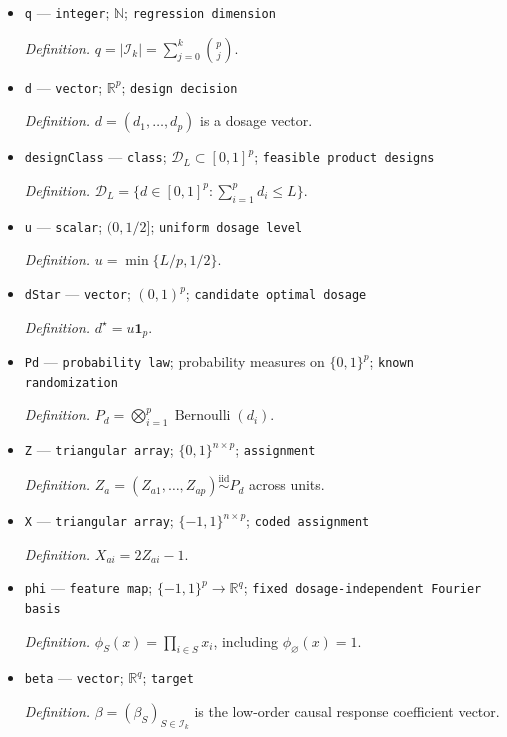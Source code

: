 \documentclass{article}
\begin{document}
\begin{itemize}
  \item \texttt{q} --- \texttt{integer}; \(\mathbb N\); \texttt{regression dimension}
  \par\smallskip\noindent\emph{Definition.} \(q=|\mathcal I_k|=\sum_{j=0}^{k}\binom pj\).
  \item \texttt{d} --- \texttt{vector}; \(\mathbb R^p\); \texttt{design decision}
  \par\smallskip\noindent\emph{Definition.} \(d=(d_1,\ldots,d_p)\) is a dosage vector.
  \item \texttt{designClass} --- \texttt{class}; \(\mathcal D_L\subset[0,1]^p\); \texttt{feasible product designs}
  \par\smallskip\noindent\emph{Definition.} \(\mathcal D_L=\{d\in[0,1]^p:\sum_{i=1}^p d_i\le L\}\).
  \item \texttt{u} --- \texttt{scalar}; \((0,1/2]\); \texttt{uniform dosage level}
  \par\smallskip\noindent\emph{Definition.} \(u=\min\{L/p,1/2\}\).
  \item \texttt{dStar} --- \texttt{vector}; \((0,1)^p\); \texttt{candidate optimal dosage}
  \par\smallskip\noindent\emph{Definition.} \(d^\star=u\mathbf 1_p\).
  \item \texttt{Pd} --- \texttt{probability law}; probability measures on \(\{0,1\}^p\); \texttt{known randomization}
  \par\smallskip\noindent\emph{Definition.} \(P_d=\bigotimes_{i=1}^p\operatorname{Bernoulli}(d_i)\).
  \item \texttt{Z} --- \texttt{triangular array}; \(\{0,1\}^{n\times p}\); \texttt{assignment}
  \par\smallskip\noindent\emph{Definition.} \(Z_a=(Z_{a1},\ldots,Z_{ap})\stackrel{\mathrm{iid}}{\sim}P_d\) across units.
  \item \texttt{X} --- \texttt{triangular array}; \(\{-1,1\}^{n\times p}\); \texttt{coded assignment}
  \par\smallskip\noindent\emph{Definition.} \(X_{ai}=2Z_{ai}-1\).
  \item \texttt{phi} --- \texttt{feature map}; \(\{-1,1\}^p\to\mathbb R^q\); \texttt{fixed dosage-\allowbreak{}independent Fourier basis}
  \par\smallskip\noindent\emph{Definition.} \(\phi_S(x)=\prod_{i\in S}x_i\), including \(\phi_{\varnothing}(x)=1\).
  \item \texttt{beta} --- \texttt{vector}; \(\mathbb R^q\); \texttt{target}
  \par\smallskip\noindent\emph{Definition.} \(\beta=(\beta_S)_{S\in\mathcal I_k}\) is the low-order causal response coefficient vector.

\end{itemize}
\end{document}
